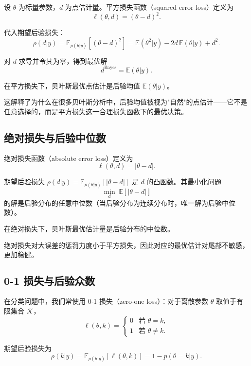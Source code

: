 设 $\theta$ 为标量参数，$d$ 为点估计量。平方损失函数（squared error loss）定义为
\[
\ell(\theta, d) = (\theta - d)^2.
\]

代入期望后验损失：
\[
\rho(d | y) = \mathbb{E}_{p(\theta|y)}[(\theta - d)^2]
           = \mathbb{E}(\theta^2 | y) - 2d \, \mathbb{E}(\theta | y) + d^2.
\]

对 $d$ 求导并令其为零，得到最优解
\[
d^{\text{Bayes}} = \mathbb{E}(\theta | y).
\]

\begin{Theorem}[平方损失下的贝叶斯最优估计]\label{th:squared-loss-bayes}
  在平方损失下，贝叶斯最优点估计是后验均值 $\mathbb{E}(\theta | y)$。
\end{Theorem}

这解释了为什么在很多贝叶斯分析中，后验均值被视为"自然"的点估计——它不是任意选择的，而是平方损失这一合理损失函数下的最优决策。

\subsection{绝对损失与后验中位数}

绝对损失函数（absolute error loss）定义为
\[
\ell(\theta, d) = |\theta - d|.
\]

期望后验损失 $\rho(d | y) = \mathbb{E}_{p(\theta|y)}[|\theta - d|]$ 是 $d$ 的凸函数。其最小化问题
\[
\underset{d}{\min} \; \mathbb{E}[|\theta - d|]
\]
的解是后验分布的任意中位数（当后验分布为连续分布时，唯一解为后验中位数）。

\begin{Theorem}[绝对损失下的贝叶斯最优估计]\label{th:absolute-loss-bayes}
  在绝对损失下，贝叶斯最优估计量是后验分布的中位数。
\end{Theorem}

绝对损失对大误差的惩罚力度小于平方损失，因此对应的最优估计对尾部不敏感，更加稳健。

\subsection{0-1 损失与后验众数}

在分类问题中，我们常使用 0-1 损失（zero-one loss）：对于离散参数 $\theta$ 取值于有限集合 $\mathcal{K}$，
\[
\ell(\theta, k) = \begin{cases}
  0 & \text{若 } \theta = k, \\
  1 & \text{若 } \theta \neq k.
\end{cases}
\]

期望后验损失为
\[
\rho(k | y) = \mathbb{E}_{p(\theta|y)}[\ell(\theta, k)] = 1 - p(\theta = k | y).
\]

